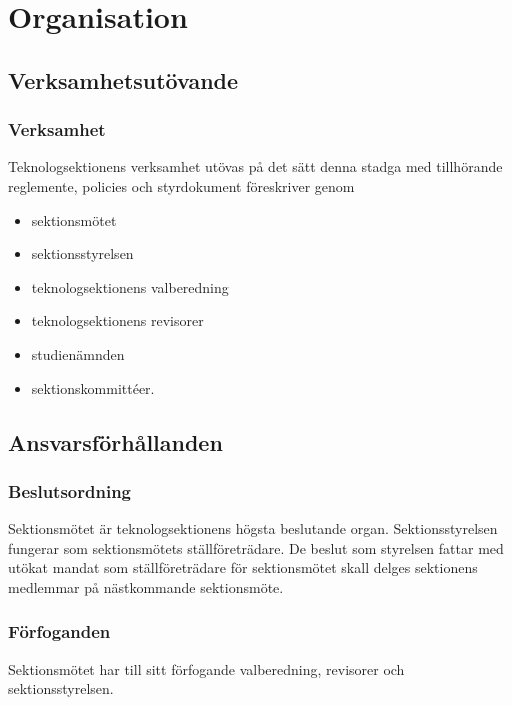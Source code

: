 \section{Organisation}

\subsection{Verksamhetsutövande}

\subsubsection{Verksamhet}
Teknologsektionens verksamhet utövas på det sätt denna stadga med tillhörande reglemente, policies och styrdokument föreskriver genom

\begin{itemize}
	\item sektionsmötet
	\item sektionsstyrelsen \STYRIT{}
	\item teknologsektionens valberedning
	\item teknologsektionens revisorer
	\item studienämnden \SNIT{}
	\item sektionskommittéer.
\end{itemize}

\subsection{Ansvarsförhållanden}

\subsubsection{Beslutsordning}
Sektionsmötet är teknologsektionens högsta beslutande organ. Sektionsstyrelsen fungerar som sektionsmötets ställföreträdare. De beslut som styrelsen fattar med utökat mandat som ställföreträdare för sektionsmötet skall delges sektionens medlemmar på nästkommande sektionsmöte.

\subsubsection{Förfoganden}
Sektionsmötet har till sitt förfogande valberedning, revisorer och sektionsstyrelsen.

